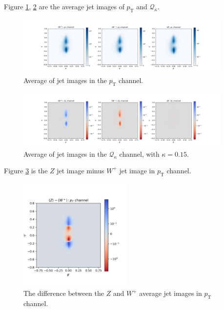 \documentclass[12pt]{article}
\begin{document}
		Figure \ref{fig:jet_image_PT}, \ref{fig:jet_image_Qk} are the average jet images of $p_\text{T}$ and $\mathcal{Q}_\kappa$.
		\begin{figure}[htpb]
			\centering
			\includegraphics[width=0.95\textwidth]{jet_image_PT.png}
			\caption{Average of jet images in the $p_\text{T}$ channel.}
			\label{fig:jet_image_PT}
		\end{figure}
		\begin{figure}[htpb]
			\centering
			\includegraphics[width=0.95\textwidth]{jet_image_Qk.png}
			\caption{Average of jet images in the $\mathcal{Q}_\kappa$ channel, with $\kappa = 0.15$.}
			\label{fig:jet_image_Qk}
		\end{figure}
		Figure \ref{fig:jet_image_PT_Z-W+} is the $Z$ jet image minus $W^{+}$ jet image in $p_\text{T}$ channel.
		\begin{figure}[htpb]
			\centering
			\includegraphics[width=0.5\textwidth]{jet_image_PT_Z-W+.png}
			\caption{The difference between the $Z$ and $W^{+}$ average jet images in $p_\text{T}$ channel.}
			\label{fig:jet_image_PT_Z-W+}
		\end{figure}
\end{document}
